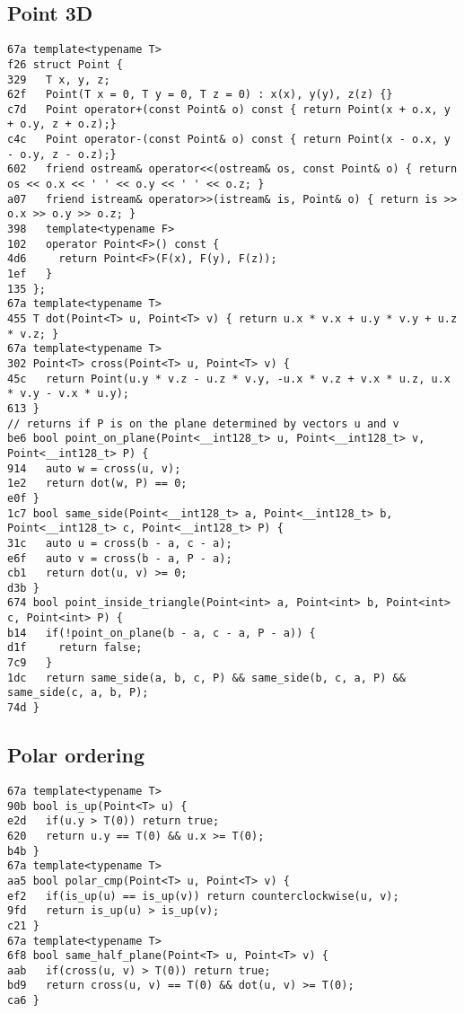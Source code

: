\documentclass[10pt, a4paper, twoside]{article}
\begin{document}
\subsection{Point 3D}
\begin{lstlisting}
67a template<typename T>
f26 struct Point {
329   T x, y, z;
62f   Point(T x = 0, T y = 0, T z = 0) : x(x), y(y), z(z) {}
c7d   Point operator+(const Point& o) const { return Point(x + o.x, y + o.y, z + o.z);}
c4c   Point operator-(const Point& o) const { return Point(x - o.x, y - o.y, z - o.z);}
602   friend ostream& operator<<(ostream& os, const Point& o) { return os << o.x << ' ' << o.y << ' ' << o.z; }
a07   friend istream& operator>>(istream& is, Point& o) { return is >> o.x >> o.y >> o.z; }
398   template<typename F>
102   operator Point<F>() const {
4d6     return Point<F>(F(x), F(y), F(z));
1ef   }
135 };
67a template<typename T>
455 T dot(Point<T> u, Point<T> v) { return u.x * v.x + u.y * v.y + u.z * v.z; }
67a template<typename T>
302 Point<T> cross(Point<T> u, Point<T> v) {
45c   return Point(u.y * v.z - u.z * v.y, -u.x * v.z + v.x * u.z, u.x * v.y - v.x * u.y);
613 }
// returns if P is on the plane determined by vectors u and v
be6 bool point_on_plane(Point<__int128_t> u, Point<__int128_t> v, Point<__int128_t> P) {
914   auto w = cross(u, v);
1e2   return dot(w, P) == 0;
e0f }
1c7 bool same_side(Point<__int128_t> a, Point<__int128_t> b, Point<__int128_t> c, Point<__int128_t> P) {
31c   auto u = cross(b - a, c - a);
e6f   auto v = cross(b - a, P - a);
cb1   return dot(u, v) >= 0;
d3b }
674 bool point_inside_triangle(Point<int> a, Point<int> b, Point<int> c, Point<int> P) {
b14   if(!point_on_plane(b - a, c - a, P - a)) {
d1f     return false;
7c9   }
1dc   return same_side(a, b, c, P) && same_side(b, c, a, P) && same_side(c, a, b, P);
74d }
\end{lstlisting}

\subsection{Polar ordering}
\begin{lstlisting}
67a template<typename T>
90b bool is_up(Point<T> u) {
e2d   if(u.y > T(0)) return true;
620   return u.y == T(0) && u.x >= T(0);
b4b }
67a template<typename T>
aa5 bool polar_cmp(Point<T> u, Point<T> v) {
ef2   if(is_up(u) == is_up(v)) return counterclockwise(u, v);
9fd   return is_up(u) > is_up(v);
c21 }
67a template<typename T>
6f8 bool same_half_plane(Point<T> u, Point<T> v) {
aab   if(cross(u, v) > T(0)) return true;
bd9   return cross(u, v) == T(0) && dot(u, v) >= T(0);
ca6 }
\end{lstlisting}
\end{document}
